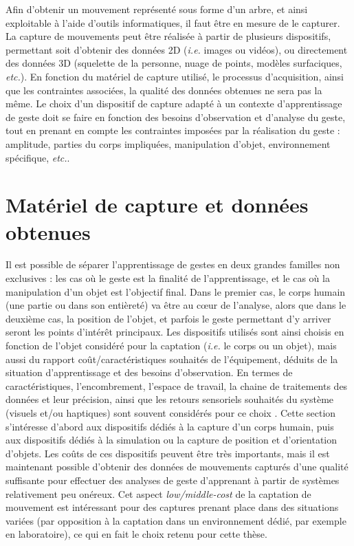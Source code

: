 Afin d'obtenir un mouvement représenté sous forme d'un arbre, et ainsi exploitable à l'aide d'outils informatiques, il faut être en mesure de le capturer. La capture de mouvements peut être réalisée à partir de plusieurs dispositifs, permettant soit d'obtenir des données 2D (\textit{i.e.} images ou vidéos), ou directement des données 3D (squelette de la personne, nuage de points, modèles surfaciques, \textit{etc.}). En fonction du matériel de capture utilisé, le processus d'acquisition, ainsi que les contraintes associées, la qualité des données obtenues ne sera pas la même. Le choix d'un dispositif de capture adapté à un contexte d'apprentissage de geste doit se faire en fonction des besoins d'observation et d'analyse du geste, tout en prenant en compte les contraintes imposées par la réalisation du geste : amplitude, parties du corps impliquées, manipulation d'objet, environnement spécifique, \textit{etc.}.

\section{Matériel de capture et données obtenues}
Il est possible de séparer l'apprentissage de gestes en deux grandes familles non exclusives : les cas où le geste est la finalité de l'apprentissage, et le cas où la manipulation d'un objet est l'objectif final. Dans le premier cas, le corps humain (une partie ou dans son entièreté) va être au cœur de l'analyse, alors que dans le deuxième cas, la position de l'objet, et parfois le geste permettant d'y arriver seront les points d'intérêt principaux. Les dispositifs utilisés sont ainsi choisis en fonction de l'objet considéré pour la captation (\textit{i.e.} le corps ou un objet), mais aussi du rapport coût/caractéristiques souhaités de l'équipement, déduits de la situation d'apprentissage et des besoins d'observation. En termes de caractéristiques, l'encombrement, l'espace de travail, la chaine de traitements des données et leur précision, ainsi que les retours sensoriels souhaités du système (visuels et/ou haptiques) sont souvent considérés pour ce choix \parencite{Chamaret2010}. Cette section s'intéresse d'abord aux dispositifs dédiés à la capture d'un corps humain, puis aux dispositifs dédiés à la simulation ou la capture de position et d'orientation d'objets. Les coûts de ces dispositifs peuvent être très importants, mais il est maintenant possible d'obtenir des données de mouvements capturés d'une qualité suffisante pour effectuer des analyses de geste d'apprenant à partir de systèmes relativement peu onéreux. Cet aspect \textit{low/middle-cost} de la captation de mouvement est intéressant pour des captures prenant place dans des situations variées (par opposition à la captation dans un environnement dédié, par exemple en laboratoire), ce qui en fait le choix retenu pour cette thèse.

